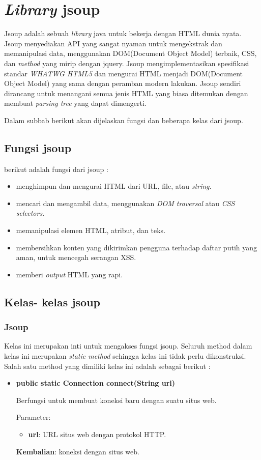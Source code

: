 \section{\textit{Library} jsoup}
\label{sec:libraryjsoup}

Jsoup adalah sebuah \textit{library} java untuk bekerja dengan HTML dunia nyata.  Jsoup menyediakan API yang sangat nyaman untuk mengekstrak dan memanipulasi data, menggunakan DOM(Document Object Model) terbaik, CSS, dan \textit{method} yang mirip dengan jquery. Jsoup mengimplementasikan spesifikasi standar \textit{WHATWG HTML5} dan mengurai HTML menjadi DOM(Document Object Model) yang sama dengan peramban modern lakukan. Jsoup sendiri dirancang untuk menangani semua jenis HTML yang biasa ditemukan dengan membuat \textit{parsing tree} yang dapat dimengerti.

Dalam subbab berikut akan dijelaskan fungsi dan beberapa kelas dari jsoup\cite{jonathanhedley2016}.
\subsection{Fungsi jsoup}
\label{subsec:fungsijsoup}
berikut adalah fungsi dari jsoup :

\begin{itemize}
	\item menghimpun dan mengurai HTML dari URL, file, atau \textsl{string}.
	\item mencari dan mengambil data, menggunakan \textit{DOM traversal} atau \textit{CSS selectors}.
	\item memanipulasi elemen HTML, atribut, dan teks.
	\item membersihkan konten yang dikirimkan pengguna terhadap daftar putih yang aman, untuk mencegah serangan XSS.
	\item memberi \textit{output} HTML yang rapi.
\end{itemize}

\subsection{Kelas- kelas jsoup}
\label{subsec:jsoupclasses}

\subsubsection{Jsoup}
\label{subsubsec:jsoup}
Kelas ini merupakan inti untuk mengakses fungsi jsoup. Seluruh method dalam kelas ini merupakan \textit{static method} sehingga kelas ini tidak perlu dikonstruksi. Salah satu method yang dimiliki kelas ini adalah sebagai berikut :
\begin{itemize}
	\item \textbf{public static Connection connect(String url)}
	
	Berfungsi untuk membuat koneksi baru dengan suatu situs web.
	
	Parameter:
	\begin{itemize}
		\item \textbf{url}: URL situs web dengan protokol HTTP.
	\end{itemize}
	\textbf{Kembalian}: koneksi dengan situs web.
\end{itemize}

